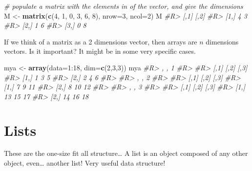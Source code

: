 \documentclass[]{book}
\newenvironment{Shaded}{}{}
\newcommand{\CommentTok}[1]{\textcolor[rgb]{0.38,0.63,0.69}{\textit{#1}}}
\newcommand{\DataTypeTok}[1]{\textcolor[rgb]{0.56,0.13,0.00}{#1}}
\newcommand{\DecValTok}[1]{\textcolor[rgb]{0.25,0.63,0.44}{#1}}
\newcommand{\KeywordTok}[1]{\textcolor[rgb]{0.00,0.44,0.13}{\textbf{#1}}}
\newcommand{\NormalTok}[1]{#1}
\newcommand{\OperatorTok}[1]{\textcolor[rgb]{0.40,0.40,0.40}{#1}}
\newcommand{\StringTok}[1]{\textcolor[rgb]{0.25,0.44,0.63}{#1}}
\theoremstyle{definition}
\theoremstyle{definition}
\theoremstyle{definition}
\theoremstyle{remark}
\begin{document}
\begin{Shaded}
\begin{Highlighting}[]
\CommentTok{# populate a matrix with the elements in of the vector, and give the dimensions}
\NormalTok{M <-}\StringTok{ }\KeywordTok{matrix}\NormalTok{(}\KeywordTok{c}\NormalTok{(}\DecValTok{4}\NormalTok{, }\DecValTok{1}\NormalTok{, }\DecValTok{0}\NormalTok{, }\DecValTok{3}\NormalTok{, }\DecValTok{6}\NormalTok{, }\DecValTok{8}\NormalTok{), }\DataTypeTok{nrow=}\DecValTok{3}\NormalTok{, }\DataTypeTok{ncol=}\DecValTok{2}\NormalTok{) }
\NormalTok{M}
\CommentTok{#R>      [,1] [,2]}
\CommentTok{#R> [1,]    4    3}
\CommentTok{#R> [2,]    1    6}
\CommentTok{#R> [3,]    0    8}
\end{Highlighting}
\end{Shaded}

If we think of a matrix as a 2 dimensions vector, then arrays are \(n\)
dimensions vectors. Is it important? It might be in some very specific
cases.

\begin{Shaded}
\begin{Highlighting}[]
\NormalTok{mya <-}\StringTok{ }\KeywordTok{array}\NormalTok{(}\DataTypeTok{data=}\DecValTok{1}\OperatorTok{:}\DecValTok{18}\NormalTok{, }\DataTypeTok{dim=}\KeywordTok{c}\NormalTok{(}\DecValTok{2}\NormalTok{,}\DecValTok{3}\NormalTok{,}\DecValTok{3}\NormalTok{))}
\NormalTok{mya}
\CommentTok{#R> , , 1}
\CommentTok{#R> }
\CommentTok{#R>      [,1] [,2] [,3]}
\CommentTok{#R> [1,]    1    3    5}
\CommentTok{#R> [2,]    2    4    6}
\CommentTok{#R> }
\CommentTok{#R> , , 2}
\CommentTok{#R> }
\CommentTok{#R>      [,1] [,2] [,3]}
\CommentTok{#R> [1,]    7    9   11}
\CommentTok{#R> [2,]    8   10   12}
\CommentTok{#R> }
\CommentTok{#R> , , 3}
\CommentTok{#R> }
\CommentTok{#R>      [,1] [,2] [,3]}
\CommentTok{#R> [1,]   13   15   17}
\CommentTok{#R> [2,]   14   16   18}
\end{Highlighting}
\end{Shaded}

\hypertarget{lists}{%
\section{Lists}\label{lists}}

These are the one-size fit all structure\ldots{} A list is an object
composed of any other object, even\ldots{} another list! Very useful
data structure!
\end{document}
